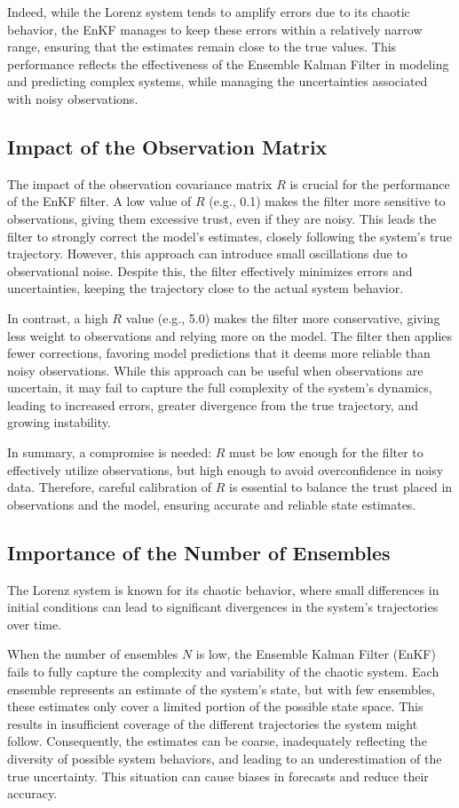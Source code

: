\documentclass[a4paper,12pt,french]{article}
\begin{document}
Indeed, while the Lorenz system tends to amplify errors due to its chaotic behavior, the EnKF manages to keep these errors within a relatively narrow range, ensuring that the estimates remain close to the true values. This performance reflects the effectiveness of the Ensemble Kalman Filter in modeling and predicting complex systems, while managing the uncertainties associated with noisy observations.
\subsection{Impact of the Observation Matrix}
The impact of the observation covariance matrix $R$ is crucial for the performance of the EnKF filter. A low value of $R$ (e.g., 0.1) makes the filter more sensitive to observations, giving them excessive trust, even if they are noisy. This leads the filter to strongly correct the model's estimates, closely following the system's true trajectory. However, this approach can introduce small oscillations due to observational noise. Despite this, the filter effectively minimizes errors and uncertainties, keeping the trajectory close to the actual system behavior.

In contrast, a high $R$ value (e.g., 5.0) makes the filter more conservative, giving less weight to observations and relying more on the model. The filter then applies fewer corrections, favoring model predictions that it deems more reliable than noisy observations. While this approach can be useful when observations are uncertain, it may fail to capture the full complexity of the system's dynamics, leading to increased errors, greater divergence from the true trajectory, and growing instability.

In summary, a compromise is needed:
$R$ must be low enough for the filter to effectively utilize observations, but high enough to avoid overconfidence in noisy data. Therefore, careful calibration of $R$ is essential to balance the trust placed in observations and the model, ensuring accurate and reliable state estimates.

\subsection{Importance of the Number of Ensembles}
The Lorenz system is known for its chaotic behavior, where small differences in initial conditions can lead to significant divergences in the system's trajectories over time.

When the number of ensembles $N$ is low, the Ensemble Kalman Filter (EnKF) fails to fully capture the complexity and variability of the chaotic system. Each ensemble represents an estimate of the system's state, but with few ensembles, these estimates only cover a limited portion of the possible state space. This results in insufficient coverage of the different trajectories the system might follow. Consequently, the estimates can be coarse, inadequately reflecting the diversity of possible system behaviors, and leading to an underestimation of the true uncertainty. This situation can cause biases in forecasts and reduce their accuracy.
\end{document}
